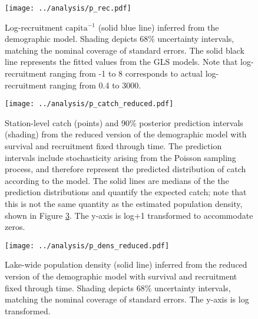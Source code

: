 \documentclass[11pt]{article}
\begin{document}
\clearpage
\begin{figure}
\centering
\texttt{[image: ../analysis/p\_rec.pdf]}
\caption{\label{fig:p_rec}
Log-recruitment $\text{capita}^{-1}$ (solid blue line) inferred from the demographic model.
Shading depicts 68\% uncertainty intervals, 
matching the nominal coverage of standard errors.
The solid black line represents the fitted values from the GLS models.
Note that log-recruitment ranging from -1 to 8 
corresponds to actual log-recruitment ranging from 0.4 to 3000.
}
\end{figure}
\clearpage







\renewcommand{\thefigure}{S\arabic{figure}}
\renewcommand{\theequation}{S\arabic{equation}}
\renewcommand{\thetable}{S\arabic{table}}
\setcounter{equation}{0}
\setcounter{figure}{0}
\setcounter{table}{0}

\begin{figure}
\centering
\texttt{[image: ../analysis/p\_catch\_reduced.pdf]}
\caption{\label{fig:p_catch_reduced}
Station-level catch (points) and 90\% posterior prediction intervals (shading) 
from the reduced version of the demographic model 
with survival and recruitment fixed through time.
The prediction intervals include stochasticity arising from the Poisson sampling process,
and therefore represent the predicted distribution of catch according to the model. 
The solid lines are medians of the the prediction distributions and quantify the expected
catch; note that this is not the same quantity as the estimated population density, 
shown in Figure \ref{fig:p_dens_reduced}.
The y-axis is log+1 transformed to accommodate zeros.
}
\end{figure}
\clearpage

\clearpage
\begin{figure}
\centering
\texttt{[image: ../analysis/p\_dens\_reduced.pdf]}
\caption{\label{fig:p_dens_reduced}
Lake-wide population density (solid line) inferred from the 
reduced version of the demographic model 
with survival and recruitment fixed through time.
Shading depicts 68\% uncertainty intervals, 
matching the nominal coverage of standard errors.
The y-axis is log transformed.
}
\end{figure}
\clearpage
\end{document}
